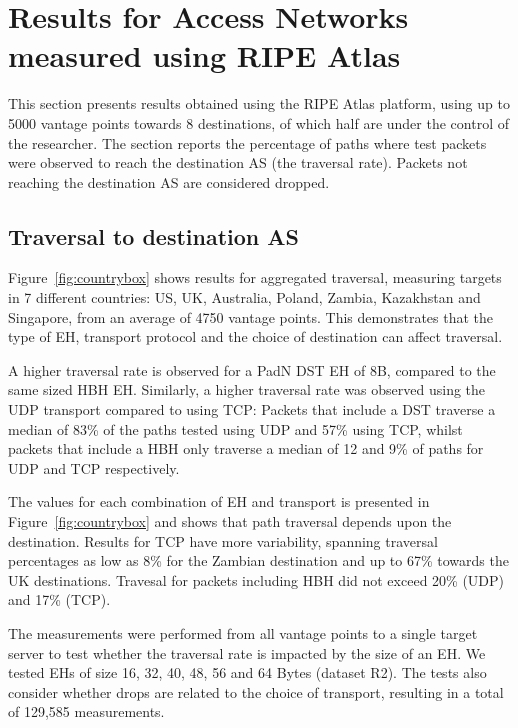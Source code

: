 \documentclass[conference]{IEEEtran}
\begin{document}
\section{Results for Access Networks measured using RIPE Atlas} 
\label{sec:ripe-results}

This section presents results obtained using the RIPE Atlas platform, using up to 5000 vantage points towards 8 destinations, of which half are under the control of the researcher. The section reports the percentage of paths where test packets were observed to reach the destination AS (the traversal rate). Packets not reaching the destination AS are considered dropped. 

\subsection{Traversal to destination AS}

Figure~\ref{fig:countrybox} shows results for aggregated traversal, measuring targets in 7 different countries: US, UK, Australia, Poland, Zambia, Kazakhstan and Singapore, from an average of 4750 vantage points. This demonstrates that the type of EH, transport protocol and the choice of destination can affect traversal.

A higher traversal rate is observed for a PadN DST EH of 8B, compared to the same sized HBH EH. Similarly, a higher traversal rate was observed using the UDP transport compared to using TCP: Packets that include a DST traverse a median of 83\% of the paths tested using UDP and 57\% using TCP, whilst packets that include a HBH only traverse a median of 12 and 9\% of paths for UDP and TCP respectively.

The values for each combination of EH and transport is presented in Figure~\ref{fig:countrybox} and shows that path traversal depends upon the destination. Results for TCP have more variability, spanning traversal percentages as low as 8\% for the Zambian destination and up to 67\% towards the UK destinations. Travesal for packets including HBH did not exceed 20\% (UDP) and 17\% (TCP).

The measurements were performed from all vantage points to a single target server to test whether the traversal rate is impacted by the size of an EH. We tested EHs of size 16, 32, 40, 48, 56 and 64 Bytes (dataset R2). The tests also consider whether drops are related to the choice of transport, resulting in a total of 129,585 measurements.
 
\end{document}
